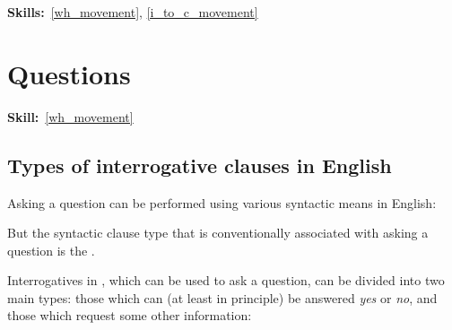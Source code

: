 \documentclass{article}
\begin{document}
\maketitle


\subtitle{Topic 11: \emph{Wh}-movement}
\hfill{}\textbf{Skills:}~\ref{wh_movement},
\ref{i_to_c_movement}

\section{Questions}
\hfill{}\textbf{Skill:}~\ref{wh_movement}

\subsection{Types of interrogative clauses in English}

Asking a question can be performed using various syntactic means in English:
\begin{exe}
\end{exe}
But the syntactic clause type that is conventionally associated with asking a question is the . 

Interrogatives in , which can be used to ask a question, can be divided into two main types: those which can (at least in principle) be answered \emph{yes} or \emph{no}, and those which request some other information:
\end{document}
